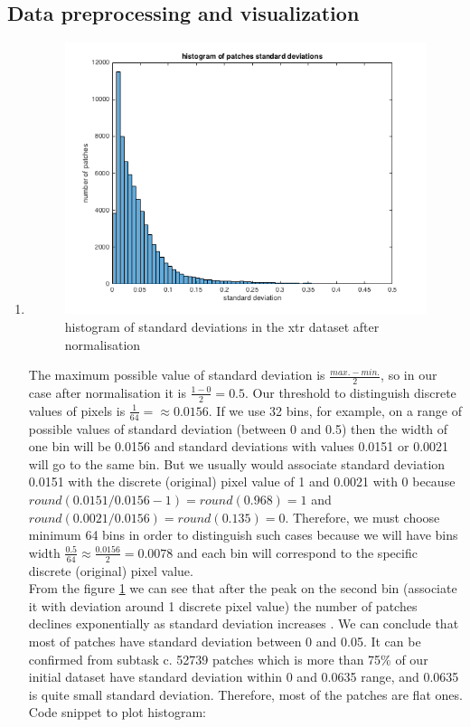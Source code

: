 \documentclass{article}
\begin{document}
		\subsection{Data preprocessing and visualization}
			 \begin{enumerate}[label=(\alph*)]
			 	\item
				 	\begin{figure}[htp]
				 		\centering
				 		\includegraphics[width=12cm]{images/p1-1-a_std_hist}
				 		\caption{histogram of standard deviations in the xtr dataset after normalisation}
				 		\label{fig:p1-1-a_std_hist}
				 	\end{figure}
				 	The maximum possible value of standard deviation is $\frac{max. - min.}{2}$, so in our case after normalisation it is $\frac{1 - 0}{2}= 0.5$. Our threshold to distinguish discrete values of pixels is $\frac{1}{64} = \approx 0.0156$. If we use 32 bins, for example, on a range of possible values of standard deviation (between 0 and 0.5) then the width of one bin will be 0.0156 and standard deviations with values  0.0151 or 0.0021 will go to the same bin. But we usually would associate standard deviation 0.0151 with the discrete (original) pixel value of 1 and 0.0021 with 0 because $round(0.0151/0.0156 - 1)=round(0.968)=1$ and $round(0.0021/0.0156)=round(0.135)=0$. Therefore, we must choose minimum 64 bins in order to distinguish such cases because we will have bins width $\frac{0.5}{64} \approx \frac{0.0156}{2} = 0.0078$ and each bin will correspond to the specific discrete (original) pixel value.\\
				 	From the figure \ref{fig:p1-1-a_std_hist} we can see that after the peak on the second bin (associate it with deviation around 1 discrete pixel value) the number of patches declines exponentially as  standard deviation increases . We can conclude that most of patches have standard deviation between 0 and 0.05. It can be confirmed from subtask c. 52739 patches which is more than 75\% of our initial dataset have standard deviation within 0 and 0.0635 range, and 0.0635 is quite small standard deviation. Therefore, most of the patches are flat ones. \\
				 	Code snippet to plot histogram:
				 	
				 	

\end{enumerate}
\end{document}
